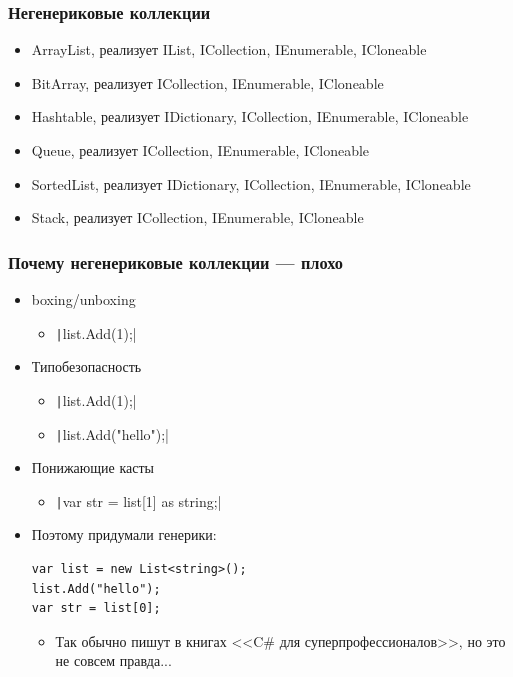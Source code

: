 \documentclass[xetex,mathserif,serif]{beamer}
\begin{document}
    \begin{frame}
        \frametitle{Негенериковые коллекции}
        \begin{itemize}
            \item ArrayList, реализует IList, ICollection, IEnumerable, ICloneable
            \item BitArray,  реализует ICollection, IEnumerable, ICloneable
            \item Hashtable, реализует IDictionary, ICollection, IEnumerable, ICloneable
            \item Queue, реализует ICollection, IEnumerable, ICloneable
            \item SortedList, реализует IDictionary, ICollection, IEnumerable, ICloneable
            \item Stack, реализует ICollection, IEnumerable, ICloneable
        \end{itemize}
    \end{frame}

    \begin{frame}[fragile]
        \frametitle{Почему негенериковые коллекции --- плохо}
        \begin{itemize}
            \item boxing/unboxing
            \begin{itemize}
                \item \texttt|list.Add(1);|
            \end{itemize}
            \item Типобезопасность
            \begin{itemize}
                \item \texttt|list.Add(1);|
                \item \texttt|list.Add("hello");|
            \end{itemize}
            \item Понижающие касты
            \begin{itemize}
                \item \texttt|var str = list[1] as string;|
            \end{itemize}
            \item Поэтому придумали генерики:
            \begin{verbatim}
var list = new List<string>();
list.Add("hello");
var str = list[0];
            \end{verbatim}
            \begin{itemize}
                \item Так обычно пишут в книгах <<C\# для суперпрофессионалов>>, но это не совсем правда...
            \end{itemize}
        \end{itemize}
    \end{frame}
\end{document}
